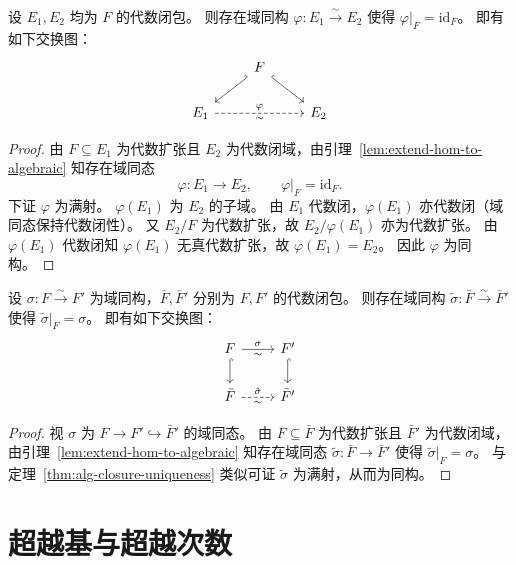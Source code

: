 \documentclass[lang=cn,a4paper,newtx]{elegantbook}
\begin{document}
\begin{theorem}[代数闭包的唯一性]\label{alg-closure-uniqueness}
  设 $E_1,E_2$ 均为 $F$ 的代数闭包。
  则存在域同构 $\varphi\colon E_1\xrightarrow{\sim} E_2$ 使得 $\varphi\big|_F=\mathrm{id}_F$。
  即有如下交换图：
  \[
    \begin{tikzcd}
      & F \arrow[dl,hook'] \arrow[dr,hook] & \\
      E_1 \arrow[rr,dashed,"\varphi","\sim"'] & & E_2
    \end{tikzcd}
  \]
\end{theorem}

\begin{proof}
  由 $F\subseteq E_1$ 为代数扩张且 $E_2$ 为代数闭域，由引理~\ref{lem:extend-hom-to-algebraic} 知存在域同态
  \[
    \varphi\colon E_1\to E_2,\qquad \varphi\big|_F=\mathrm{id}_F.
  \]
  下证 $\varphi$ 为满射。
  $\varphi(E_1)$ 为 $E_2$ 的子域。
  由 $E_1$ 代数闭，$\varphi(E_1)$ 亦代数闭（域同态保持代数闭性）。
  又 $E_2/F$ 为代数扩张，故 $E_2/\varphi(E_1)$ 亦为代数扩张。
  由 $\varphi(E_1)$ 代数闭知 $\varphi(E_1)$ 无真代数扩张，故 $\varphi(E_1)=E_2$。
  因此 $\varphi$ 为同构。
\end{proof}

\begin{theorem}
  设 $\sigma\colon F\xrightarrow{\sim} F'$ 为域同构，$\bar F,\bar F'$ 分别为 $F,F'$ 的代数闭包。
  则存在域同构 $\tilde\sigma\colon\bar F\xrightarrow{\sim}\bar F'$ 使得 $\tilde\sigma\big|_F=\sigma$。
  即有如下交换图：
  \[
    \begin{tikzcd}
      F \arrow[r,"\sigma","\sim"'] \arrow[d,hook] & F' \arrow[d,hook] \\
      \bar F \arrow[r,dashed,"\tilde\sigma","\sim"'] & \bar F'
    \end{tikzcd}
  \]
\end{theorem}

\begin{proof}
  视 $\sigma$ 为 $F\to F'\hookrightarrow\bar F'$ 的域同态。
  由 $F\subseteq\bar F$ 为代数扩张且 $\bar F'$ 为代数闭域，由引理~\ref{lem:extend-hom-to-algebraic} 知存在域同态 $\tilde\sigma\colon\bar F\to\bar F'$ 使得 $\tilde\sigma\big|_F=\sigma$。
  与定理~\ref{thm:alg-closure-uniqueness} 类似可证 $\tilde\sigma$ 为满射，从而为同构。
\end{proof}

\section{超越基与超越次数}
\end{document}
